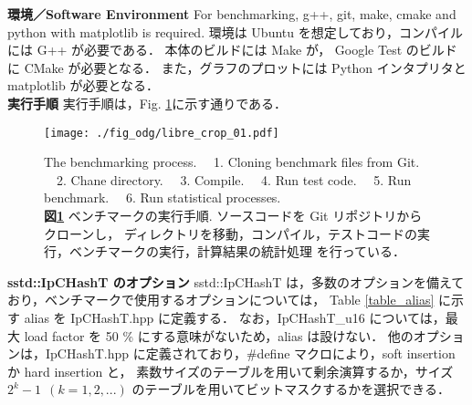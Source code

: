
\newpage
{\bf 環境／Software Environment}
\samepage\newline\indent
For benchmarking, g++, git, make, cmake and python with matplotlib is required.
\samepage\newline\indent
環境は Ubuntu を想定しており，コンパイルには G++ が必要である．
本体のビルドには Make が，
Google Test のビルドに CMake が必要となる．
また，グラフのプロットには Python インタプリタと matplotlib が必要となる．
\\

{\bf 実行手順}
\samepage\newline\indent
実行手順は，Fig. \ref{fig_command}に示す通りである．
\begin{figure}[h]
  \texttt{[image: ./fig\_odg/libre\_crop\_01.pdf]}
  \caption{
    The benchmarking process. \ \ 
    1. Cloning benchmark files from Git. \ \ 
    2. Chane directory. \ \ 
    3. Compile. \ \ 
    4. Run test code. \ \ 
    5. Run benchmark. \ \ 
    6. Run statistical processes.
    \\
    {\bf 図\ref{fig_command}}
    ベンチマークの実行手順.
    ソースコードを Git リポジトリからクローンし，
    ディレクトリを移動，コンパイル，テストコードの実行，ベンチマークの実行，計算結果の統計処理
    を行っている．
  }
  \label{fig_command}
\end{figure}

{\bf sstd::IpCHashT のオプション}
\samepage\newline\indent
sstd::IpCHashT は，多数のオプションを備えており，ベンチマークで使用するオプションについては，
Table \ref{table_alias} に示す alias を IpCHashT.hpp に定義する．
なお，IpCHashT\_u16 については，最大 load factor を 50 \% にする意味がないため，alias は設けない．
他のオプションは，IpCHashT.hpp に定義されており，\#define マクロにより，soft insertion か hard insertion と，
素数サイズのテーブルを用いて剰余演算するか，サイズ $2^k-1\ \ (k=1,2,...)$ のテーブルを用いてビットマスクするかを選択できる．

